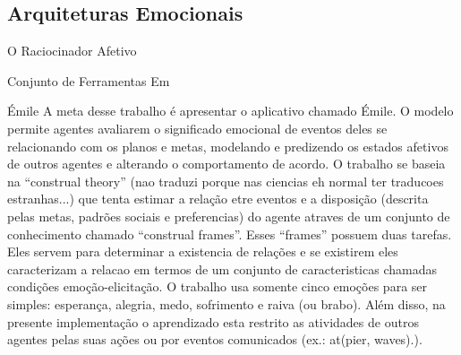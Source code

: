 \subsection{Arquiteturas Emocionais} %


{O Raciocinador Afetivo} %
\cite{elliott1992tar}

{Conjunto de Ferramentas Em} %

{Émile}
\cite{gratch2000empitae}
A meta desse trabalho é apresentar o aplicativo chamado Émile. O modelo
permite agentes avaliarem o significado emocional de eventos deles se
relacionando com os planos e metas, modelando e predizendo os estados afetivos
de outros agentes e alterando o comportamento de acordo.  O trabalho se baseia
na ``construal theory'' (nao traduzi porque nas ciencias eh normal ter
traducoes estranhas...) que tenta estimar a relação etre eventos e a
disposição (descrita pelas metas, padrões sociais e preferencias) do agente
atraves de um conjunto de conhecimento chamado ``construal frames''. Esses
``frames'' possuem duas tarefas. Eles servem para determinar a existencia de
relações e se existirem eles caracterizam a relacao em termos de um conjunto
de caracteristicas chamadas condições emoção-elicitação.
%
O trabalho usa somente cinco emoções para ser simples: esperança, alegria,
medo, sofrimento e raiva (ou brabo). Além disso, na presente implementação o
aprendizado esta restrito as atividades de outros agentes pelas suas ações ou
por eventos comunicados (ex.: at(pier, waves).).


